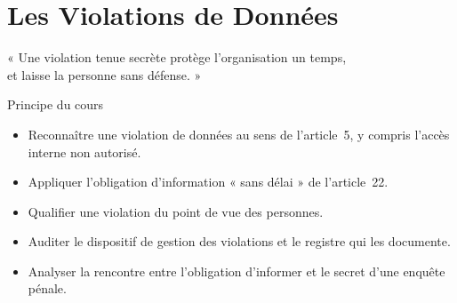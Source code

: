 
\chapter{Les Violations de Données}
\label{chap:violations}

\epigraph{%
    « Une violation tenue secrète protège l'organisation un temps,\\
    et laisse la personne sans défense. »%
}{Principe du cours}


\begin{boxobjectifs}
\begin{itemize}
    \item Reconnaître une violation de données au sens de l'article~5,
          y compris l'accès interne non autorisé.
    \item Appliquer l'obligation d'information « sans délai » de
          l'article~22.
    \item Qualifier une violation du point de vue des personnes.
    \item Auditer le dispositif de gestion des violations et le registre
          qui les documente.
    \item Analyser la rencontre entre l'obligation d'informer et le secret
          d'une enquête pénale.
\end{itemize}
\end{boxobjectifs}

\bigskip

